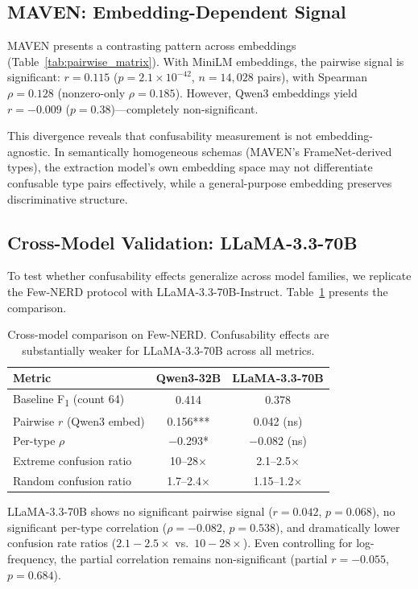 \documentclass[11pt,a4paper]{article}
\newcommand{\fone}{F\textsubscript{1}}
\begin{document}
\subsection{MAVEN: Embedding-Dependent Signal}
\label{sec:maven_pairwise}

MAVEN presents a contrasting pattern across embeddings (Table~\ref{tab:pairwise_matrix}).
With MiniLM embeddings, the pairwise signal is significant: $r{=}0.115$ ($p{=}2.1{\times}10^{-42}$, $n{=}14{,}028$ pairs), with Spearman $\rho{=}0.128$ (nonzero-only $\rho{=}0.185$).
However, Qwen3 embeddings yield $r{=}{-}0.009$ ($p{=}0.38$)---completely non-significant.

This divergence reveals that confusability measurement is not embedding-agnostic.
In semantically homogeneous schemas (MAVEN's FrameNet-derived types), the extraction model's own embedding space may not differentiate confusable type pairs effectively, while a general-purpose embedding preserves discriminative structure.

\subsection{Cross-Model Validation: LLaMA-3.3-70B}
\label{sec:crossmodel}

To test whether confusability effects generalize across model families, we replicate the Few-NERD protocol with LLaMA-3.3-70B-Instruct.
Table~\ref{tab:crossmodel} presents the comparison.

\begin{table}[t]
\centering
\caption{Cross-model comparison on Few-NERD. Confusability effects are substantially weaker for LLaMA-3.3-70B across all metrics.}
\label{tab:crossmodel}
\small
\begin{tabular}{lcc}
\toprule
\textbf{Metric} & \textbf{Qwen3-32B} & \textbf{LLaMA-3.3-70B} \\
\midrule
Baseline \fone{} (count 64) & 0.414 & 0.378 \\
Pairwise $r$ (Qwen3 embed) & 0.156*** & 0.042 (ns) \\
Per-type $\rho$ & $-$0.293* & $-$0.082 (ns) \\
Extreme confusion ratio & 10--28$\times$ & 2.1--2.5$\times$ \\
Random confusion ratio & 1.7--2.4$\times$ & 1.15--1.2$\times$ \\
\bottomrule
\end{tabular}
\end{table}

LLaMA-3.3-70B shows no significant pairwise signal ($r{=}0.042$, $p{=}0.068$), no significant per-type correlation ($\rho{=}{-}0.082$, $p{=}0.538$), and dramatically lower confusion rate ratios ($2.1{-}2.5{\times}$ vs.\ $10{-}28{\times}$).
Even controlling for log-frequency, the partial correlation remains non-significant (partial $r{=}{-}0.055$, $p{=}0.684$).
\end{document}
